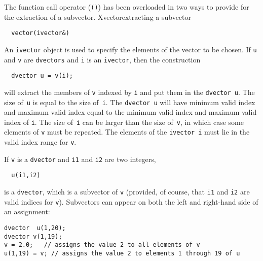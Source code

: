 \documentclass{admbmanual}
\begin{document}
The function call operator (\texttt{()}) has been overloaded in two ways to
provide for the extraction of a subvector. 
X{vector}{extracting a subvector}
\begin{lstlisting}
  vector(ivector&)
\end{lstlisting}
An \texttt{ivector} object is
used to specify the elements of the vector to be chosen. If 
\texttt{u} and \texttt{v} are \texttt{dvectors}  and \texttt{i} is an \texttt{ivector}, then
the construction
\begin{lstlisting}
  dvector u = v(i);
\end{lstlisting}
will extract the members of \texttt{v} indexed by \texttt{i} and put them in the
\texttt{dvector u}. The size of~\texttt{u}
is equal to the size of~\texttt{i}. The \texttt{dvector u} will have
minimum valid index and maximum valid index equal to the minimum
valid index and maximum valid index of \texttt{i}. 
The size of~\texttt{i} can be larger than the size of~\texttt{v}, 
in which case some elements of \texttt{v} must be repeated. The elements of
the \texttt{ivector i} must lie in the valid index range for \texttt{v}. 

If \texttt{v} is a \texttt{dvector} and \texttt{i1} and \texttt{i2} are two integers,  
\begin{lstlisting} 
  u(i1,i2)
\end{lstlisting}
is a \texttt{dvector}, which is a subvector of \texttt{v} (provided, of
course, that \texttt{i1} and \texttt{i2} are valid indices for \texttt{v}). Subvectors
can appear on both the left and right-hand side of an assignment:
\begin{lstlisting}
dvector  u(1,20);
dvector v(1,19);
v = 2.0;   // assigns the value 2 to all elements of v
u(1,19) = v; // assigns the value 2 to elements 1 through 19 of u
\end{lstlisting}
\end{document}

